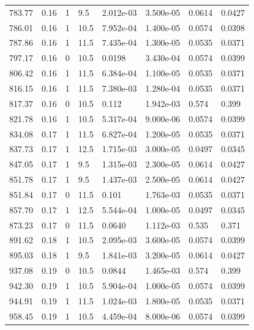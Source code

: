 \documentclass[preview]{standalone}
\begin{document}
{{{\begin{tabular}{L{1.2cm}C{1.2cm} C{0.3cm}C{0.5cm} C{1.4cm}C{1.4cm} C{1.4cm}C{1.4cm}}
  783.77  &  0.16  & 1     & 9.5 &  2.012e-03  & 3.500e-05  & 0.0614 &  0.0427   \\ 
  786.01  &  0.16  & 1     & 10.5 &  7.952e-04  & 1.400e-05  & 0.0574 &  0.0398   \\ 
  787.86  &  0.16  & 1     & 11.5 &  7.435e-04  & 1.300e-05  & 0.0535 &  0.0371   \\ 
  797.17  &  0.16  & 0     & 10.5 &  0.0198  & 3.430e-04  & 0.0574 &  0.0399   \\ 
  806.42  &  0.16  & 1     & 11.5 &  6.384e-04  & 1.100e-05  & 0.0535 &  0.0371   \\ 
  816.15  &  0.16  & 1     & 11.5 &  7.380e-03  & 1.280e-04  & 0.0535 &  0.0371   \\ 
  817.37  &  0.16  & 0     & 10.5 &  0.112  & 1.942e-03  & 0.574 &  0.399   \\ 
  821.78  &  0.16  & 1     & 10.5 &  5.317e-04  & 9.000e-06  & 0.0574 &  0.0399   \\ 
  834.08  &  0.17  & 1     & 11.5 &  6.827e-04  & 1.200e-05  & 0.0535 &  0.0371   \\ 
  837.73  &  0.17  & 1     & 12.5 &  1.715e-03  & 3.000e-05  & 0.0497 &  0.0345   \\ 
  847.05  &  0.17  & 1     & 9.5 &  1.315e-03  & 2.300e-05  & 0.0614 &  0.0427   \\ 
  851.78  &  0.17  & 1     & 9.5 &  1.437e-03  & 2.500e-05  & 0.0614 &  0.0427   \\ 
  851.84  &  0.17  & 0     & 11.5 &  0.101  & 1.763e-03  & 0.0535 &  0.0371   \\ 
  857.70  &  0.17  & 1     & 12.5 &  5.544e-04  & 1.000e-05  & 0.0497 &  0.0345   \\ 
  873.23  &  0.17  & 0     & 11.5 &  0.0640  & 1.112e-03  & 0.535 &  0.371   \\ 
  891.62  &  0.18  & 1     & 10.5 &  2.095e-03  & 3.600e-05  & 0.0574 &  0.0399   \\ 
  895.03  &  0.18  & 1     & 9.5 &  1.841e-03  & 3.200e-05  & 0.0614 &  0.0427   \\ 
  937.08  &  0.19  & 0     & 10.5 &  0.0844  & 1.465e-03  & 0.574 &  0.399   \\ 
  942.30  &  0.19  & 1     & 10.5 &  5.904e-04  & 1.000e-05  & 0.0574 &  0.0399   \\ 
  944.91  &  0.19  & 1     & 11.5 &  1.024e-03  & 1.800e-05  & 0.0535 &  0.0371   \\ 
  958.45  &  0.19  & 1     & 10.5 &  4.459e-04  & 8.000e-06  & 0.0574 &  0.0399   \\ 

\end{tabular}}}}
\end{document}
